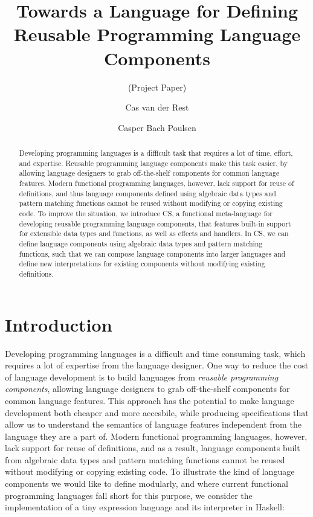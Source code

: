 \documentclass[runningheads]{llncs}
\title{Towards a Language for Defining Reusable Programming Language Components}
\subtitle{(Project Paper)}
\author{Cas van der Rest\orcidID{0000-0002-0059-5353} \and Casper Bach Poulsen\orcidID{0000-0003-0622-7639}}
\institute{\email{c.r.vanderrest@tudelft.nl} \ \ \ \ 
  \email{c.b.poulsen@tudelft.nl}
 \\  Delft University of Technology, Delft, The Netherlands}
\newcommand{\strachey}{\textsc{CS}}
\begin{document}
\maketitle

\begin{abstract}

  Developing programming languages is a difficult task that requires a lot of
  time, effort, and expertise. Reusable programming language components make
  this task easier, by allowing language designers to grab off-the-shelf
  components for common language features. Modern functional programming
  languages, however, lack support for reuse of definitions, and thus language
  components defined using algebraic data types and pattern matching functions
  cannot be reused without modifying or copying existing code. To improve the
  situation, we introduce \strachey{}, a functional meta-language for developing
  reusable programming language components, that features built-in support for
  extensible data types and functions, as well as effects and handlers. In
  \strachey{}, we can define language components using algebraic data types and
  pattern matching functions, such that we can compose language components into
  larger languages and define new interpretations for existing components
  without modifying existing definitions.
  
\end{abstract}



\section{Introduction}
\label{sec:introduction}

Developing programming languages is a difficult and time consuming task, which
requires a lot of expertise from the language designer. One way to reduce the
cost of language development is to build languages from \emph{reusable
  programming components}, allowing language designers to grab off-the-shelf
components for common language features. This approach has the potential to make
language development both cheaper and more accesbile, while producing
specifications that allow us to understand the semantics of language features
independent from the language they are a part of. Modern functional programming
languages, however, lack support for reuse of definitions, and as a result,
language components built from algebraic data types and pattern matching
functions cannot be reused without modifying or copying existing code.  To
illustrate the kind of language components we would like to define modularly,
and where current functional programming languages fall short for this purpose,
we consider the implementation of a tiny expression language and its interpreter
in Haskell:
\end{document}
